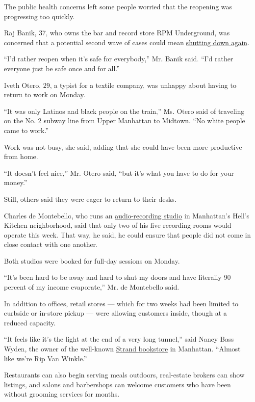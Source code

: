 The public health concerns left some people worried that the reopening
was progressing too quickly.

Raj Banik, 37, who owns the bar and record store RPM Underground, was
concerned that a potential second wave of cases could mean
\href{https://www.nytimes3xbfgragh.onion/2020/07/16/business/economy/company-reopening-coronavirus.html}{shutting
down again}.

``I'd rather reopen when it's safe for everybody,'' Mr. Banik said.
``I'd rather everyone just be safe once and for all.''

Iveth Otero, 29, a typist for a textile company, was unhappy about
having to return to work on Monday.

``It was only Latinos and black people on the train,'' Ms. Otero said of
traveling on the No. 2 subway line from Upper Manhattan to Midtown. ``No
white people came to work.''

Work was not busy, she said, adding that she could have been more
productive from home.

``It doesn't feel nice,'' Mr. Otero said, ``but it's what you have to do
for your money.''

Still, others said they were eager to return to their desks.

Charles de Montebello, who runs an
\href{https://cdmstudios.com/}{audio-recording studio} in Manhattan's
Hell's Kitchen neighborhood, said that only two of his five recording
rooms would operate this week. That way, he said, he could ensure that
people did not come in close contact with one another.

Both studios were booked for full-day sessions on Monday.

``It's been hard to be away and hard to shut my doors and have literally
90 percent of my income evaporate,'' Mr. de Montebello said.

In addition to offices, retail stores --- which for two weeks had been
limited to curbside or in-store pickup --- were allowing customers
inside, though at a reduced capacity.

``It feels like it's the light at the end of a very long tunnel,'' said
Nancy Bass Wyden, the owner of the well-known
\href{https://www.nytimes3xbfgragh.onion/2018/12/03/nyregion/strand-bookstore-landmark.html}{Strand
bookstore} in Manhattan. ``Almost like we're Rip Van Winkle.''

Restaurants can also begin serving meals outdoors, real-estate brokers
can show listings, and salons and barbershops can welcome customers who
have been without grooming services for months.

